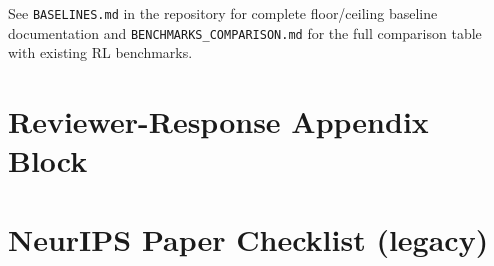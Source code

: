 \documentclass{article}
\begin{document}
See \texttt{BASELINES.md} in the repository for complete floor/ceiling baseline documentation
and \texttt{BENCHMARKS\_COMPARISON.md} for the full comparison table with existing RL benchmarks.

\section{Reviewer-Response Appendix Block}
\label{app:reviewer_response}



















\iffalse

\section*{NeurIPS Paper Checklist (legacy)}
\end{document}
